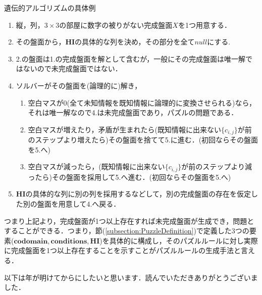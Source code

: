 \begin{example}\textup{遺伝的アルゴリズムの具体例}
  \begin{enumerate}
    \item 縦，列，$3\times3$の部屋に数字の被りがない完成盤面$X$を1つ用意する．
    \item その盤面から，$\mathbf{HI}$の具体的な列を決め，その部分を全て$null$にする.
    \item 2.の盤面は1.の完成盤面を解として含むが，一般にその完成盤面は唯一解ではないので未完成盤面ではない．
    \item ソルバーがその盤面を(論理的に)解き，
          \begin{enumerate}
            \item 空白マスが0(全て未知情報を既知情報に論理的に変換させられる)なら，それは唯一解なので4.は未完成盤面であり，パズルの問題である．
            \item 空白マスが増えたり，矛盾が生まれたら(既知情報に出来ない$\{c_{i,j}\}$が前のステップより増えたら)その盤面を捨てて5.に進む．(初回ならその盤面を5.へ)
            \item 空白マスが減ったら，(既知情報に出来ない$\{c_{i,j}\}$が前のステップより減ったら)その盤面を採用して5.へ進む．(初回ならその盤面を5.へ)
          \end{enumerate}
    \item $\mathbf{HI}$の具体的な列に別の列を採用するなどして，別の完成盤面の存在を仮定した別の盤面を用意して4.へ戻る．
  \end{enumerate}
\end{example}

つまり上記より，完成盤面が1つ以上存在すれば未完成盤面が生成でき，問題とすることができる．つまり，節(\ref{subsection:PuzzleDefinition})で定義した3つの要素($\mathbf{codomain,conditions,HI}$)を具体的に構成し，そのパズルルールに対し実際に完成盤面を1つ以上存在することを示すことがパズルルールの生成手法と言える．


以下は年が明けてからにしたいと思います．読んでいただきありがとうございました．
